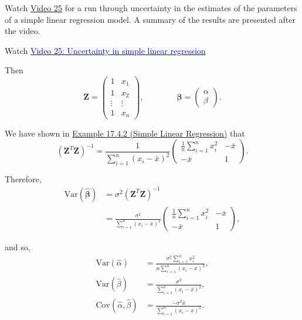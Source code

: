 \documentclass[
]{book}
\begin{document}
Watch \protect\hyperlink{video25}{Video 25} for a run through uncertainty in the estimates of the parameters of a simple linear regression model. A summary of the results are presented after the video.

Watch \href{https://mediaspace.nottingham.ac.uk/media/Uncertainty+in+Simple+Linear+Regression+FINAL+VERSION/1_7hbhop79}{\textcolor{blue}{Video 25: Uncertainty in simple linear regression}}

Then\\

\[ \mathbf{Z} = \begin{pmatrix} 1 & x_1 \\ 1 & x_2 \\ \vdots & \vdots \\ 1 & x_n \end{pmatrix}, \qquad \qquad \mathbf{\beta} = \begin{pmatrix} \alpha \\ \beta \end{pmatrix}.\]

We have shown in \protect\hyperlink{Sec_Linear_LSE:ex:reg}{Example 17.4.2 (Simple Linear Regression)} that\\

\[ \left( \mathbf{Z}^T\mathbf{Z} \right)^{-1} = \frac{1}{ \sum\limits_{i=1}^n (x_i - \bar{x})^2 } \begin{pmatrix}
\frac{1}{n} \sum\limits_{i=1}^n x_i^2 & -\bar{x} \\
-\bar{x} & 1 \end{pmatrix}. \]

Therefore,\\

\begin{align*}
\text{Var} \left( \mathbf{\hat{\beta}} \right) &= \sigma^2 \left( \mathbf{Z}^T \mathbf{Z} \right)^{-1} \\
&= \frac{\sigma^2}{ \sum\limits_{i=1}^n (x_i - \bar{x})^2 } \begin{pmatrix} \frac{1}{n} \sum\limits_{i=1}^n x_i^2 & -\bar{x} \\ -\bar{x} & 1 \end{pmatrix},
\end{align*}

and so,\\

\begin{align*}
\text{Var}(\hat{\alpha}) &= \frac{ \sigma^2 \sum\limits_{i=1}^n x_i^2 }{ n \sum\limits_{i=1}^n (x_i-\bar{x})^2 }, \\[5pt]
\text{Var}(\hat{\beta}) &= \frac{\sigma^2}{ \sum\limits_{i=1}^n (x_i-\bar{x})^2 }, \\[5pt]
\text{Cov}(\hat{\alpha},\hat{\beta}) &= \frac{ - \sigma^2 \bar{x} }{ \sum\limits_{i=1}^n (x_i-\bar{x})^2 }.
\end{align*}
\end{document}
